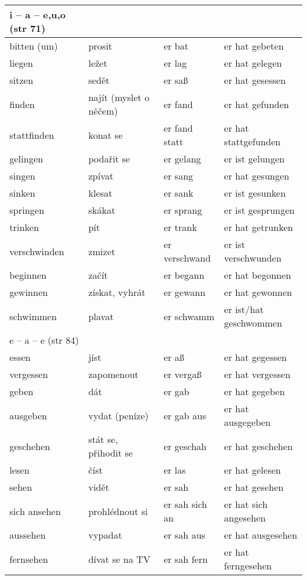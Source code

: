 \documentclass{article}
\begin{document}
\begin{tabular}{ p{3cm}|p{3cm}|p{3cm}|p{4cm}  }
    \hline
    i -- a -- e,u,o (str 71)\\
    \hline
    bitten (um) & prosit & er bat & er hat gebeten \\
    liegen & ležet & er lag & er hat gelegen \\
    sitzen & sedět & er sa{\ss} & er hat gesessen \\
    finden & najít (myslet o něčem) & er fand & er hat gefunden \\
    stattfinden & konat se & er fand statt & er hat stattgefunden \\
    gelingen & podařit se & er gelang & er ist gelungen \\
    singen & zpívat & er sang & er hat gesungen \\
    sinken & klesat & er sank &  er ist gesunken \\
    springen & skákat & er sprang & er ist gesprungen \\
    trinken & pít & er trank & er hat getrunken \\
    verschwinden & zmizet & er verschwand & er ist verschwunden \\
    beginnen & začít & er begann & er hat begonnen \\
    gewinnen & získat, vyhrát & er gewann & er hat gewonnen \\
    schwimmen & plavat & er schwamm & er ist/hat geschwommen \\
    \hline
    e -- a -- e (str 84)\\
    \hline
    essen & jíst & er a{\ss} & er hat gegessen \\
    vergessen & zapomenout & er verga{\ss} & er hat vergessen \\
    geben & dát & er gab & er hat gegeben \\
    ausgeben & vydat (peníze) & er gab aus & er hat ausgegeben \\
    geschehen & stát se, přihodit se & er geschah & er hat geschehen \\
    lesen & číst & er las & er hat gelesen \\
    sehen & vidět & er sah & er hat gesehen \\
    sich ansehen & prohlédnout si & er sah sich an & er hat sich angesehen \\
    aussehen & vypadat & er sah aus & er hat ausgesehen \\
    fernsehen & dívat se na TV & er sah fern & er hat ferngesehen \\

\end{tabular}
\end{document}
